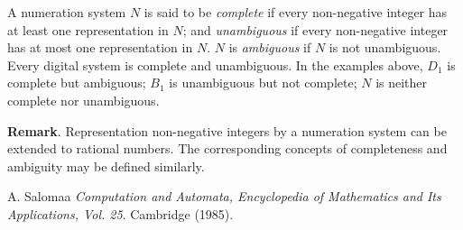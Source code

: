 \documentclass[12pt]{article}
\begin{document}
A numeration system $N$ is said to be \emph{complete} if every non-negative integer has at least one representation in $N$; and \emph{unambiguous} if every non-negative integer has at most one representation in $N$.  $N$ is \emph{ambiguous} if $N$ is not unambiguous.  Every digital system is complete and unambiguous.  In the examples above, $D_1$ is complete but ambiguous; $B_1$ is unambiguous but not complete; $N$ is neither complete nor unambiguous.

\textbf{Remark}.  Representation non-negative integers by a numeration system can be extended to rational numbers.  The corresponding concepts of completeness and ambiguity may be defined similarly.

\begin{thebibliography}{9}
 A. Salomaa {\em Computation and Automata, Encyclopedia of Mathematics and Its Applications, Vol. 25}. Cambridge (1985).
\end{thebibliography}
\end{document}
